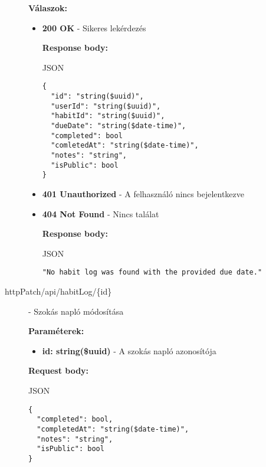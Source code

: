 \documentclass[12pt]{report}
\begin{document}
\begin{description}
    \vspace{0.5cm}
    \textbf{Válaszok:}
    \begin{itemize}
      \item \textbf{200 OK} - Sikeres lekérdezés

        \textbf{Response body:}
        \begin{codeblock}{JSON}
          \begin{verbatim}
{
  "id": "string($uuid)",
  "userId": "string($uuid)",
  "habitId": "string($uuid)",
  "dueDate": "string($date-time)",
  "completed": bool
  "comletedAt": "string($date-time)",
  "notes": "string",
  "isPublic": bool
}
          \end{verbatim}
        \end{codeblock}

      \item \textbf{401 Unauthorized} - A felhasználó nincs bejelentkezve

      \item \textbf{404 Not Found} - Nincs találat
      
        \textbf{Response body:}
        \begin{codeblock}{JSON}
          \begin{verbatim}
"No habit log was found with the provided due date."
          \end{verbatim}
        \end{codeblock}
    \end{itemize}

  \item[httpPatch{/api/habitLog/\{id\}}] - Szokás napló módosítása
  
    \vspace{0.5cm}
    \textbf{Paraméterek:}
    \begin{itemize}
      \item \textbf{id: string(\$uuid)} - A szokás napló azonosítója
    \end{itemize}

    \vspace{0.5cm}
    \textbf{Request body:}
    \begin{codeblock}{JSON}
      \begin{verbatim}
{
  "completed": bool,
  "completedAt": "string($date-time)",
  "notes": "string",
  "isPublic": bool
}
      \end{verbatim}
    \end{codeblock}


\end{description}
\end{document}
